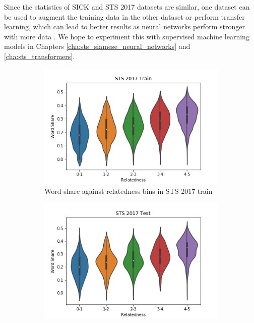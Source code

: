 \begin{enumerate}
Since the statistics of SICK and STS 2017 datasets are similar, one dataset can be used to augment the training data in the other dataset or perform transfer learning, which can lead to better results as neural networks perform stronger with more data \autocite{wang-etal-2020-evaluating,info:doi/10.2196/23086}. We hope to experiment this with supervised machine learning models in Chapters \ref{cha:sts_siamese_neural_networks} and \ref{cha:sts_transformers}.

\begin{figure}
	\captionsetup[subfigure]{justification=centering}
	\centering
	\begin{subfigure}[b]{.5\textwidth}
		\centering
		\includegraphics[width=\textwidth]{figures/semantic_textual_similarity/introduction/sts_2017_train_word_share.png}
		\caption{Word share against relatedness bins in STS 2017 train}
		\label{fig:sts_train_word_share}
	\end{subfigure}%
	\begin{subfigure}[b]{.5\textwidth}
		\centering
		\includegraphics[width=\textwidth]{figures/semantic_textual_similarity/introduction/sts_2017_test_word_share.png}

\end{subfigure}
\end{figure}
\end{enumerate}
